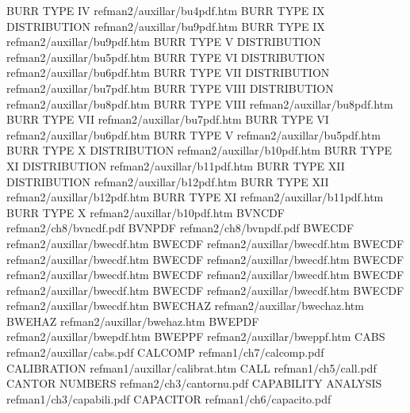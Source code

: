 BURR TYPE IV                            refman2/auxillar/bu4pdf.htm
BURR TYPE IX DISTRIBUTION               refman2/auxillar/bu9pdf.htm
BURR TYPE IX                            refman2/auxillar/bu9pdf.htm
BURR TYPE V DISTRIBUTION                refman2/auxillar/bu5pdf.htm
BURR TYPE VI DISTRIBUTION               refman2/auxillar/bu6pdf.htm
BURR TYPE VII DISTRIBUTION              refman2/auxillar/bu7pdf.htm
BURR TYPE VIII DISTRIBUTION             refman2/auxillar/bu8pdf.htm
BURR TYPE VIII                          refman2/auxillar/bu8pdf.htm
BURR TYPE VII                           refman2/auxillar/bu7pdf.htm
BURR TYPE VI                            refman2/auxillar/bu6pdf.htm
BURR TYPE V                             refman2/auxillar/bu5pdf.htm
BURR TYPE X DISTRIBUTION                refman2/auxillar/b10pdf.htm
BURR TYPE XI DISTRIBUTION               refman2/auxillar/b11pdf.htm
BURR TYPE XII DISTRIBUTION              refman2/auxillar/b12pdf.htm
BURR TYPE XII                           refman2/auxillar/b12pdf.htm
BURR TYPE XI                            refman2/auxillar/b11pdf.htm
BURR TYPE X                             refman2/auxillar/b10pdf.htm
BVNCDF                                  refman2/ch8/bvncdf.pdf
BVNPDF                                  refman2/ch8/bvnpdf.pdf
BWECDF                                  refman2/auxillar/bwecdf.htm
BWECDF                                  refman2/auxillar/bwecdf.htm
BWECDF                                  refman2/auxillar/bwecdf.htm
BWECDF                                  refman2/auxillar/bwecdf.htm
BWECDF                                  refman2/auxillar/bwecdf.htm
BWECDF                                  refman2/auxillar/bwecdf.htm
BWECDF                                  refman2/auxillar/bwecdf.htm
BWECDF                                  refman2/auxillar/bwecdf.htm
BWECDF                                  refman2/auxillar/bwecdf.htm
BWECHAZ                                 refman2/auxillar/bwechaz.htm
BWEHAZ                                  refman2/auxillar/bwehaz.htm
BWEPDF                                  refman2/auxillar/bwepdf.htm
BWEPPF                                  refman2/auxillar/bweppf.htm
CABS                                    refman2/auxillar/cabs.pdf
CALCOMP                                 refman1/ch7/calcomp.pdf
CALIBRATION                             refman1/auxillar/calibrat.htm
CALL                                    refman1/ch5/call.pdf
CANTOR NUMBERS                          refman2/ch3/cantornu.pdf
CAPABILITY ANALYSIS                     refman1/ch3/capabili.pdf
CAPACITOR                               refman1/ch6/capacito.pdf
